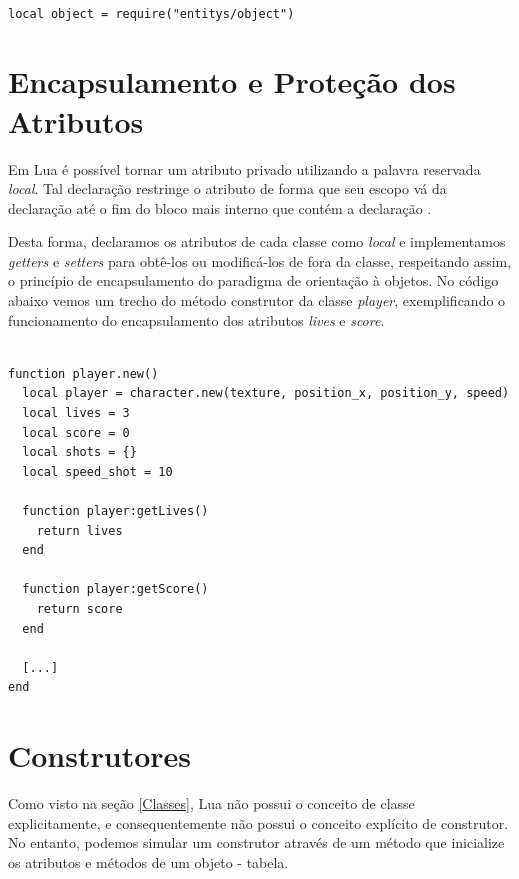 \documentclass[rel_mlp]{iiufrgs}
\begin{document}
\begin{lstlisting}

local object = require("entitys/object")

\end{lstlisting}


\section{Encapsulamento e Proteção dos Atributos}

Em Lua é possível tornar um atributo privado utilizando a palavra reservada \textit{local}. Tal declaração restringe o atributo de forma que seu escopo vá da declaração até o fim do bloco mais interno que contém a declaração \citep{IntroLuaPDF}.

Desta forma, declaramos os atributos de cada classe como \textit{local} e implementamos \textit{getters} e \textit{setters} para obtê-los ou modificá-los de fora da classe, respeitando assim, o princípio de encapsulamento do paradigma de orientação à objetos. No código abaixo vemos um trecho do método construtor da classe \textit{player}, exemplificando o funcionamento do encapsulamento dos atributos \textit{lives} e \textit{score}.

\clearpage

\begin{lstlisting}

function player.new()
  local player = character.new(texture, position_x, position_y, speed)
  local lives = 3
  local score = 0
  local shots = {}
  local speed_shot = 10

  function player:getLives()
    return lives
  end

  function player:getScore()
    return score
  end
  
  [...]
end

\end{lstlisting}



\section{Construtores} \label{Construtores}

Como visto na seção \ref{Classes}, Lua não possui o conceito de classe explicitamente, e consequentemente não possui o conceito explícito de construtor. No entanto, podemos simular um construtor através de um método que inicialize os atributos e métodos de um objeto - tabela. 
\end{document}
